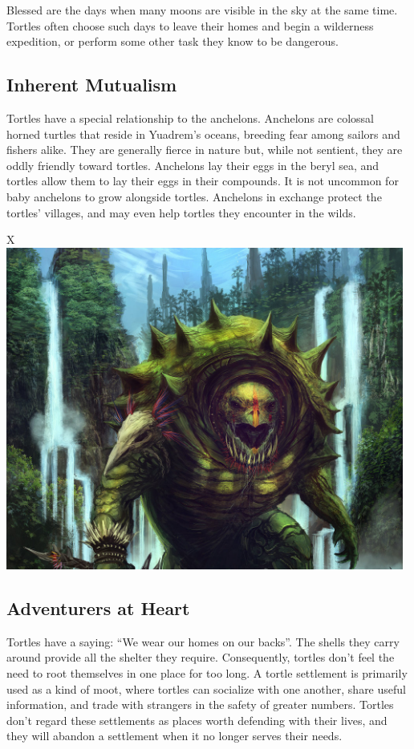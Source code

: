     Blessed are the days when many moons are visible in the sky at the same time.
    Tortles often choose such days to leave their homes and begin a wilderness expedition, or perform some other task they know to be dangerous.

\subsection*{Inherent Mutualism}
    Tortles have a special relationship to the anchelons.
    Anchelons are colossal horned turtles that reside in Yuadrem's oceans, breeding fear among sailors and fishers alike.
    They are generally fierce in nature but, while not sentient, they are oddly friendly toward tortles.
    Anchelons lay their eggs in the beryl sea, and tortles allow them to lay their eggs in their compounds.
    It is not uncommon for baby anchelons to grow alongside tortles.
    Anchelons in exchange protect the tortles' villages, and may even help tortles they encounter in the wilds.

\begin{table}[b]%
    \begin{DndTable}[width=\linewidth]{X}
        \includegraphics[width=0.98\textwidth]{04kins/img/17tortle_spiked.jpg}
    \end{DndTable}
\end{table}

\subsection*{Adventurers at Heart}
    Tortles have a saying: ``We wear our homes on our backs''.
    The shells they carry around provide all the shelter they require.
    Consequently, tortles don't feel the need to root themselves in one place for too long.
    A tortle settlement is primarily used as a kind of moot, where tortles can socialize with one another, share useful information, and trade with strangers in the safety of greater numbers.
    Tortles don't regard these settlements as places worth defending with their lives, and they will abandon a settlement when it no longer serves their needs.


